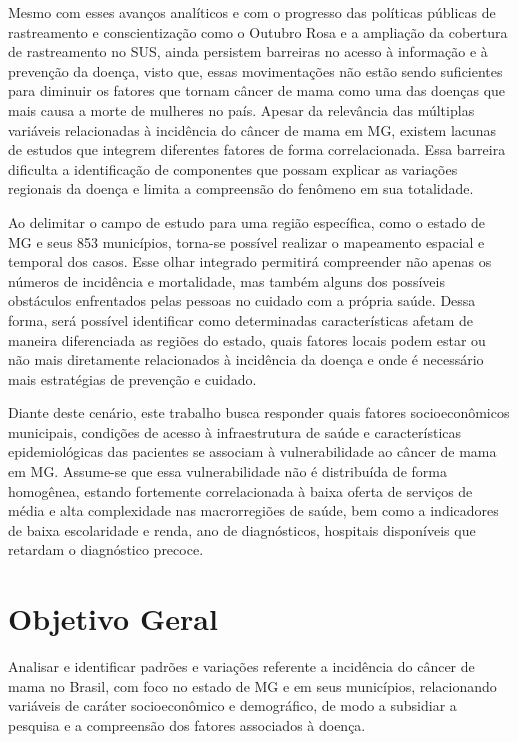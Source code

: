 Mesmo com esses avanços analíticos e com o progresso das políticas públicas de rastreamento e conscientização como o Outubro Rosa e a ampliação da cobertura de rastreamento no SUS, ainda persistem barreiras no acesso à informação e à prevenção da doença, visto que, essas movimentações não estão sendo suficientes para diminuir os fatores que tornam câncer de mama como uma das doenças que mais causa a morte de mulheres no país. Apesar da relevância das múltiplas variáveis relacionadas à incidência do câncer de mama em MG, existem lacunas de estudos que integrem diferentes fatores de forma correlacionada. Essa barreira dificulta a identificação de componentes que possam explicar as variações regionais da doença e limita a compreensão do fenômeno em sua totalidade.

Ao delimitar o campo de estudo para uma região específica, como o estado de MG e seus 853 municípios, torna-se possível realizar o mapeamento espacial e temporal dos casos. Esse olhar integrado permitirá compreender não apenas os números de incidência e mortalidade, mas também alguns dos possíveis obstáculos enfrentados pelas pessoas no cuidado com a própria saúde. Dessa forma, será possível identificar como determinadas características afetam de maneira diferenciada as regiões do estado, quais fatores locais podem estar ou não mais diretamente relacionados à incidência da doença e onde é necessário mais estratégias de prevenção e cuidado.


Diante deste cenário, este trabalho busca responder quais fatores socioeconômicos municipais, condições de acesso à infraestrutura de saúde e características epidemiológicas das pacientes se associam à vulnerabilidade ao câncer de mama em MG. Assume-se que essa vulnerabilidade não é distribuída de forma homogênea, estando fortemente correlacionada à baixa oferta de serviços de média e alta complexidade nas macrorregiões de saúde, bem como a indicadores de baixa escolaridade e renda, ano de diagnósticos, hospitais disponíveis que retardam o diagnóstico precoce.

\section{Objetivo Geral}

Analisar e identificar padrões e variações referente a incidência do câncer de mama no Brasil, com foco no estado de MG e em seus municípios, relacionando variáveis de caráter socioeconômico e demográfico, de modo a subsidiar a pesquisa e a compreensão dos fatores associados à doença.


